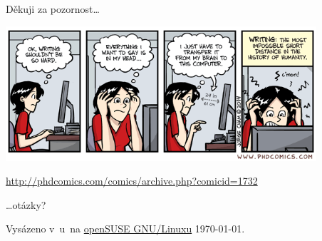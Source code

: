\documentclass[compress, ucs, xelatex, 11pt, xcolor=svgnames, aspectratio=169,
	hyperref={
		bookmarks=true,
		unicode=true,
		colorlinks=true,
		pdftitle={Citacni software},
		plainpages=false,
		pdfauthor={Vojtech Zeisek},
		pdfsubject={Kratky uvod do citacniho software},
		pdfcreator={XeLaTeX},
		pdfkeywords={citace, reference, software, literatura},
		linkcolor=Crimson, %
		anchorcolor=Magenta, %
		citecolor=Magenta, %
		filecolor=Magenta, %
		menucolor=Magenta, %
		urlcolor=DarkTurquoise, %
		pdftex},
	url={hyphens, lowtilde} %
	]{beamer}
\begin{document}
\begin{frame}{Děkuji za pozornost\ldots}
	\begin{center}
		\includegraphics[height=5cm]{phdcomics_writing.png}
	\end{center}
	\begin{scriptsize}
		\url{http://phdcomics.com/comics/archive.php?comicid=1732}
	\end{scriptsize}
	\begin{flushright}
		\ldots otázky?
	\end{flushright}
	\begin{tiny}
		Vysázeno v~\XeLaTeX u~na \href{https://www.opensuse.org/}{openSUSE GNU/Linuxu} \today.
	\end{tiny}
\end{frame}
\end{document}
